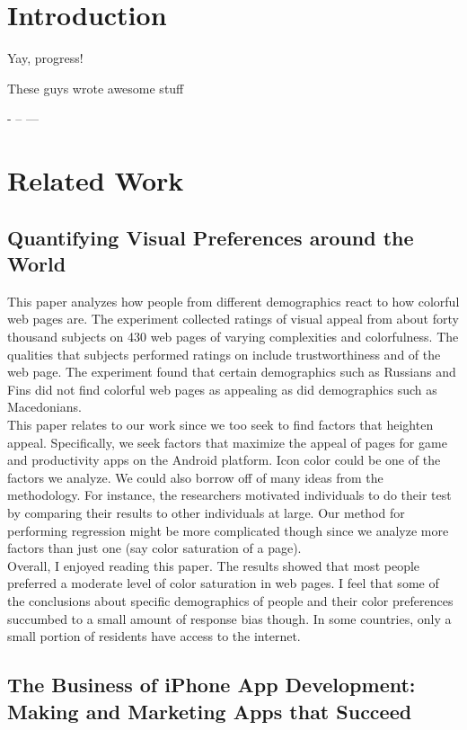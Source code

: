\section{Introduction}

Yay, progress!

These guys wrote awesome stuff~\cite{tohidi06:getting,tohidi06:user}

-
-- 
---

\section{Related Work}

\subsection{Quantifying Visual Preferences around the World}
This paper analyzes how people from different demographics react to how colorful web pages are. The experiment collected ratings of visual appeal from about forty thousand subjects on 430 web pages of varying complexities and colorfulness. The qualities that subjects performed ratings on include trustworthiness and  of the web page. The experiment found that certain demographics such as Russians and Fins did not find colorful web pages as appealing as did demographics such as Macedonians. \\

This paper relates to our work since we too seek to find factors that heighten appeal. Specifically, we seek factors that maximize the appeal of pages for game and productivity apps on the Android platform. Icon color could be one of the factors we analyze. We could also borrow off of many ideas from the methodology. For instance, the researchers motivated individuals to do their test by comparing their results to other individuals at large. Our method for performing regression might be more complicated though since we analyze more factors than just one (say color saturation of a page). \\

Overall, I enjoyed reading this paper. The results showed that most people preferred a moderate level of color saturation in web pages. I feel that some of the conclusions about specific demographics of people and their color preferences succumbed to a small amount of response bias though. In some countries, only a small portion of residents have access to the internet.

\subsection{The Business of iPhone App Development: Making and Marketing Apps that Succeed}

